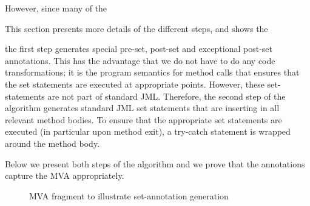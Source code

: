 However, since many of the 

This section presents more details of the different steps, and shows
the 

the first step generates
special pre-set, post-set and exceptional post-set annotations. This
has the advantage that we do not have to do any code transformations;
it is the program semantics for method calls that ensures that the set
statements are executed at appropriate points. However, these
set-statements are not part of standard JML. Therefore, the second
step of the algorithm generates standard JML set statements that are
inserting in all relevant method bodies. To ensure that the
appropriate set statements are executed (in particular upon method
exit), a try-catch statement is wrapped around the method body. 

Below we present both steps of the algorithm and we prove that the
annotations capture the MVA appropriately.

\begin{figure}
\begin{center}
\end{center}
\caption{MVA fragment to illustrate set-annotation
generation}\label{FigAnnotGenExample}

\end{figure}
